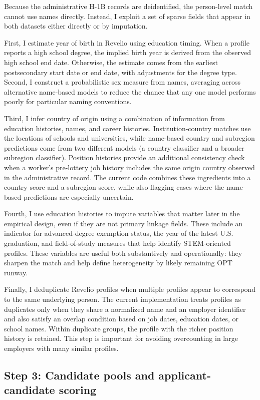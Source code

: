 Because the administrative H-1B records are deidentified, the person-level match cannot use names directly. Instead, I exploit a set of sparse fields that appear in both datasets either directly or by imputation.

First, I estimate year of birth in Revelio using education timing. When a profile reports a high school degree, the implied birth year is derived from the observed high school end date. Otherwise, the estimate comes from the earliest postsecondary start date or end date, with adjustments for the degree type. Second, I construct a probabilistic sex measure from names, averaging across alternative name-based models to reduce the chance that any one model performs poorly for particular naming conventions.

Third, I infer country of origin using a combination of information from education histories, names, and career histories. Institution-country matches use the locations of schools and universities, while name-based country and subregion predictions come from two different models (a country classifier and a broader subregion classifier). Position histories provide an additional consistency check when a worker's pre-lottery job history includes the same origin country observed in the administrative record. The current code combines these ingredients into a country score and a subregion score, while also flagging cases where the name-based predictions are especially uncertain.

Fourth, I use education histories to impute variables that matter later in the empirical design, even if they are not primary linkage fields. These include an indicator for advanced-degree exemption status, the year of the latest U.S. graduation, and field-of-study measures that help identify STEM-oriented profiles. These variables are useful both substantively and operationally: they sharpen the match and help define heterogeneity by likely remaining OPT runway.

Finally, I deduplicate Revelio profiles when multiple profiles appear to correspond to the same underlying person. The current implementation treats profiles as duplicates only when they share a normalized name and an employer identifier and also satisfy an overlap condition based on job dates, education dates, or school names. Within duplicate groups, the profile with the richer position history is retained. This step is important for avoiding overcounting in large employers with many similar profiles.

\subsection{Step 3: Candidate pools and applicant-candidate scoring}

